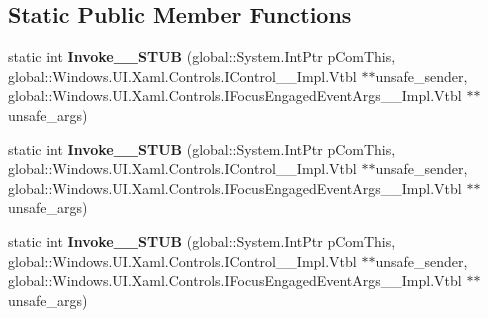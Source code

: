 \subsection*{Static Public Member Functions}
\begin{DoxyCompactItemize}
\item 
\mbox{\label{struct_windows_1_1_foundation_1_1_typed_event_handler___a___windows___u_i___xaml___controls___cobd4a24aa41f7e9787f0e1d263ab457b2_a0d5780a73342005ac8a32aeebbb40fab}} 
static int {\bfseries Invoke\+\_\+\+\_\+\+S\+T\+UB} (global\+::\+System.\+Int\+Ptr p\+Com\+This, global\+::\+Windows.\+U\+I.\+Xaml.\+Controls.\+I\+Control\+\_\+\+\_\+\+Impl.\+Vtbl $\ast$$\ast$unsafe\+\_\+sender, global\+::\+Windows.\+U\+I.\+Xaml.\+Controls.\+I\+Focus\+Engaged\+Event\+Args\+\_\+\+\_\+\+Impl.\+Vtbl $\ast$$\ast$unsafe\+\_\+args)
\item 
\mbox{\label{struct_windows_1_1_foundation_1_1_typed_event_handler___a___windows___u_i___xaml___controls___cobd4a24aa41f7e9787f0e1d263ab457b2_a0d5780a73342005ac8a32aeebbb40fab}} 
static int {\bfseries Invoke\+\_\+\+\_\+\+S\+T\+UB} (global\+::\+System.\+Int\+Ptr p\+Com\+This, global\+::\+Windows.\+U\+I.\+Xaml.\+Controls.\+I\+Control\+\_\+\+\_\+\+Impl.\+Vtbl $\ast$$\ast$unsafe\+\_\+sender, global\+::\+Windows.\+U\+I.\+Xaml.\+Controls.\+I\+Focus\+Engaged\+Event\+Args\+\_\+\+\_\+\+Impl.\+Vtbl $\ast$$\ast$unsafe\+\_\+args)
\item 
\mbox{\label{struct_windows_1_1_foundation_1_1_typed_event_handler___a___windows___u_i___xaml___controls___cobd4a24aa41f7e9787f0e1d263ab457b2_a0d5780a73342005ac8a32aeebbb40fab}} 
static int {\bfseries Invoke\+\_\+\+\_\+\+S\+T\+UB} (global\+::\+System.\+Int\+Ptr p\+Com\+This, global\+::\+Windows.\+U\+I.\+Xaml.\+Controls.\+I\+Control\+\_\+\+\_\+\+Impl.\+Vtbl $\ast$$\ast$unsafe\+\_\+sender, global\+::\+Windows.\+U\+I.\+Xaml.\+Controls.\+I\+Focus\+Engaged\+Event\+Args\+\_\+\+\_\+\+Impl.\+Vtbl $\ast$$\ast$unsafe\+\_\+args)
\item 
\mbox{\label{struct_windows_1_1_foundation_1_1_typed_event_handler___a___windows___u_i___xaml___controls___cobd4a24aa41f7e9787f0e1d263ab457b2_a0d5780a73342005ac8a32aeebbb40fab}} 

\end{DoxyCompactItemize}
